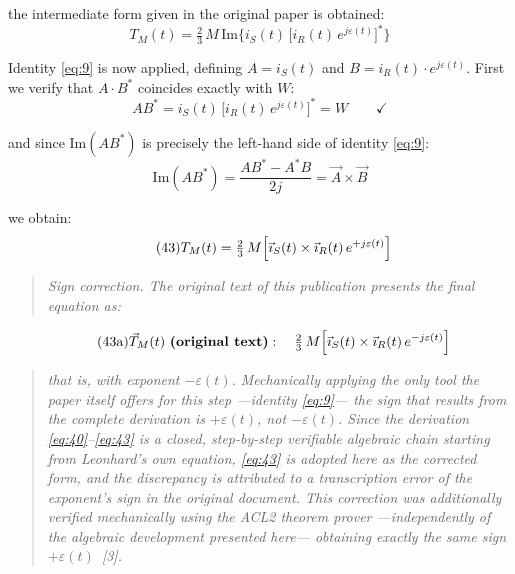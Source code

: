 \documentclass[11pt,a4paper]{article}
\begin{document}
the intermediate form given in the original paper is obtained:
\begin{equation}\tag{42}\label{eq:42}
T_M(t) = \tfrac23\,M\,\mathrm{Im}\bigl\{i_S(t)\,\bigl[i_R(t)\,e^{j\varepsilon(t)}\bigr]^{*}\bigr\}
\end{equation}

Identity \eqref{eq:9} is now applied, defining $A=i_S(t)$ and $B=i_R(t)\cdot e^{j\varepsilon(t)}$. First we verify that $A\cdot B^{*}$ coincides exactly with $W$:
\begin{equation}\tag{42a}\label{eq:42a}
AB^{*} = i_S(t)\,\bigl[i_R(t)\,e^{j\varepsilon(t)}\bigr]^{*} = W\qquad\checkmark
\end{equation}

and since $\mathrm{Im}(AB^{*})$ is precisely the left-hand side of identity \eqref{eq:9}:
\begin{equation}\tag{42b}\label{eq:42b}
\mathrm{Im}(AB^{*}) = \frac{AB^{*} - A^{*}B}{2j} = \vec A\times\vec B
\end{equation}

we obtain:
\begin{equation}\tag{43}\label{eq:43}
T_M(t) = \tfrac23\,M\Bigl[\vec\imath_S(t)\times\vec\imath_R(t)\,e^{+j\varepsilon(t)}\Bigr]
\end{equation}

\begin{quote}\emph{Sign correction. The original text of this publication presents the final equation as:}\end{quote}
\begin{equation}\tag{43a}\label{eq:43a}
\vec T_M(t)\ \textbf{(original text)}:\quad \tfrac23\,M\Bigl[\vec\imath_S(t)\times\vec\imath_R(t)\,e^{-j\varepsilon(t)}\Bigr]
\end{equation}

\begin{quote}\emph{that is, with exponent $-\varepsilon(t)$. Mechanically applying the only tool the paper itself offers for this step ---identity \eqref{eq:9}--- the sign that results from the complete derivation is $+\varepsilon(t)$, not $-\varepsilon(t)$. Since the derivation \eqref{eq:40}--\eqref{eq:43} is a closed, step-by-step verifiable algebraic chain starting from Leonhard's own equation, \eqref{eq:43} is adopted here as the corrected form, and the discrepancy is attributed to a transcription error of the exponent's sign in the original document. This correction was additionally verified mechanically using the ACL2 theorem prover ---independently of the algebraic development presented here--- obtaining exactly the same sign $+\varepsilon(t)$~[3].}\end{quote}
\end{document}
